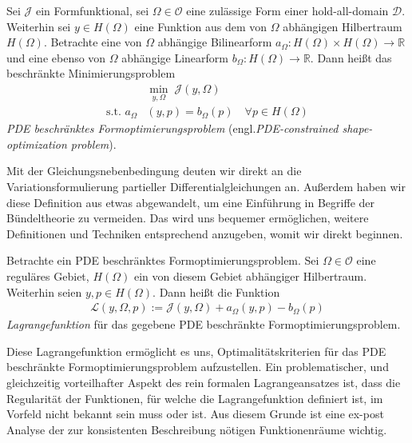 \begin{defi}\label{Pde constrained shape}
Sei $\mathcal{J}$ ein Formfunktional, sei $\Omega \in \mathcal{O}$ eine zulässige Form einer hold-all-domain $\mathcal{D}$. Weiterhin sei $y\in H(\Omega)$ eine Funktion aus dem von $\Omega$ abhängigen Hilbertraum $H(\Omega)$. Betrachte eine von $\Omega$ abhängige Bilinearform $a_{\Omega}: H(\Omega) \times H(\Omega) \rightarrow \mathbb{R}$ und eine ebenso von $\Omega$ abhängige Linearform $b_{\Omega}: H(\Omega) \rightarrow \mathbb{R}$. Dann heißt das beschränkte Minimierungsproblem
\begin{equation}\label{PDE constrained equation}
	\begin{aligned}
	&\underset{y,\Omega}{\min}\;\mathcal{J}(y,\Omega) \\
	\text{s.t. } a_{\Omega}&(y,p) = b_{\Omega}(p) \quad \forall p\in H(\Omega)
	\end{aligned}
\end{equation}
\textit{PDE beschränktes Formoptimierungsproblem} (engl.\textit{PDE-constrained  \newline shape-optimization problem}).
\end{defi}

Mit der Gleichungsnebenbedingung deuten wir direkt an die Variationsformulierung partieller Differentialgleichungen an. Außerdem haben wir diese Definition aus \cite{LagrangeNewton} etwas abgewandelt, um eine Einführung in Begriffe der Bündeltheorie zu vermeiden. Das wird uns bequemer ermöglichen, weitere Definitionen und Techniken entsprechend anzugeben, womit wir direkt beginnen.

\begin{defi}[Lagrangefunktion]\label{lagrangefunction}
Betrachte ein PDE beschränktes Formoptimierungsproblem. Sei $\Omega \in \mathcal{O}$ eine reguläres Gebiet, $H(\Omega)$ ein von diesem Gebiet abhängiger Hilbertraum. Weiterhin seien $y,p\in H(\Omega)$. Dann heißt die Funktion
\begin{align*}
	\mathcal{L}(y,\Omega, p) := \mathcal{J}(y,\Omega) + a_{\Omega}(y,p) - b_{\Omega}(p)
\end{align*}
\textit{Lagrangefunktion} für das gegebene PDE beschränkte Formoptimierungsproblem.
\end{defi}

Diese Lagrangefunktion ermöglicht es uns, Optimalitätskriterien für das PDE beschränkte Formoptimierungsproblem aufzustellen. Ein problematischer, und gleichzeitig vorteilhafter Aspekt des rein formalen Lagrangeansatzes ist, dass die Regularität der Funktionen, für welche die Lagrangefunktion definiert ist, im Vorfeld nicht bekannt sein muss oder ist. Aus diesem Grunde ist eine ex-post Analyse der zur konsistenten Beschreibung nötigen Funktionenräume wichtig. 


